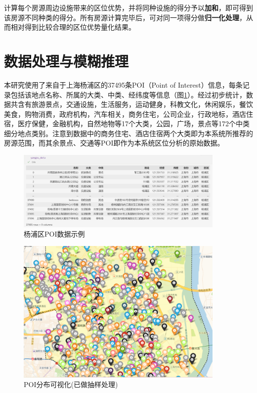 \documentclass{article}
\begin{document}
计算每个房源周边设施带来的区位优势，并将同种设施的得分予以\textbf{加和}，即可得到该房源不同种类的得分。所有房源计算完毕后，可对同一项得分做\textbf{归一化处理}，从而相对得到比较合理的区位优势量化结果。

\section{数据处理与模糊推理}

本研究使用了来自于上海杨浦区的37495条POI（Point of Interest）信息，每条记录包括该地点名称、所属的大类、中类、经纬度等信息（图\ref{数据示例}）。经过初步统计，数据共含有旅游景点，交通设施，生活服务，运动健身，科教文化，休闲娱乐，餐饮美食，购物消费，政府机构，汽车相关，商务住宅，公司企业，行政地标，酒店住宿，医疗保健，金融机构，自然地物等17个大类，公园，广场，景点等172个中类细分地点类别。注意到数据中的商务住宅、酒店住宿两个大类即为本系统所推荐的房源范围，而其余景点、交通等POI即作为本系统区位分析的原始数据。

\begin{figure}[htbp]
\centering
\includegraphics[width=0.9\textwidth]{./pic/数据示例.png}
\caption{杨浦区POI数据示例}
\label{数据示例}
\end{figure}

\begin{figure}[htbp]
\centering
\includegraphics[width=0.9\textwidth]{./pic/地图示例.png}
\caption{POI分布可视化(已做抽样处理)}
\label{地图示例}
\end{figure}
\end{document}
